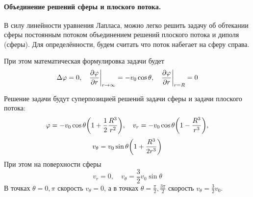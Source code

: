 \paragraph{Объединение решений сферы и плоского потока.} В силу линейности уравнения Лапласа, можно легко решить задачу об обтекании сферы постоянным потоком объединением решений плоского потока и диполя (сферы). Для определённости, будем считать что поток набегает на сферу справа. 

При этом математическая формулировка задачи будет
\begin{equation}
    \Delta \varphi = 0, \quad
    \pdv{\varphi}{r}\bigg|_{r\to \infty} = -v_0 \cos\theta, \quad
    \pdv{\varphi}{r}\bigg|_{r=R} = 0
\end{equation}

Решение задачи будут суперпозицией решений задачи сферы и задачи плоского потока:
\begin{equation}
    \varphi = -v_0 \cos\theta \qty(1+\frac{1}{2}\frac{R^3}{r^2}), \quad
    v_r = -v_0\cos\theta \qty(1-\frac{R^3}{r^3}),
\end{equation}
\begin{equation}
	v_\theta = v_0\sin\theta \qty(1+\frac{R^3}{2r^3})
\end{equation}
При этом на поверхности сферы
\begin{equation}
    v_r = 0, \quad
    v_\theta = \frac{3}{2}v_0\sin\theta
\end{equation}
В точках $\theta=0,\pi$ скорость $v_\theta=0$, а в точках $\theta=\frac{\pi}{2}, \frac{3\pi}{2}$ скорость $v_\theta=\frac{3}{2}v_0$.

